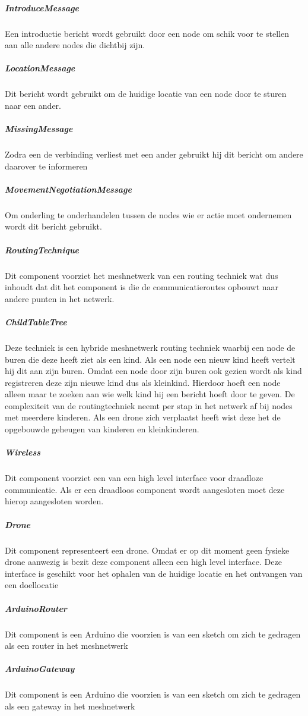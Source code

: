 \documentclass[a4paper, 11pt, oneside]{report}
\begin{document}
\subparagraph{IntroduceMessage}
\label{architectural:subcomponenten:IntroduceMessage}
Een introductie bericht wordt gebruikt door een node om schik voor te stellen aan alle andere nodes die dichtbij zijn. 
\subparagraph{LocationMessage}
\label{architectural:subcomponenten:LocationMessage}
Dit bericht wordt gebruikt om de huidige locatie van een node door te sturen naar een ander.
\subparagraph{MissingMessage}
\label{architectural:subcomponenten:MissingMessage}
Zodra een  de verbinding verliest met een ander gebruikt hij dit bericht om andere daarover te informeren
\subparagraph{MovementNegotiationMessage}	
\label{architectural:subcomponenten:MovementNegotiationMessage}
Om onderling te onderhandelen tussen de nodes wie er actie moet ondernemen wordt dit bericht gebruikt.
\subparagraph{RoutingTechnique}
\label{architectural:subcomponenten:RoutingTechnique}
Dit component voorziet het meshnetwerk van een routing techniek wat dus inhoudt dat dit het component is die de communicatieroutes opbouwt naar andere punten in het netwerk.
  
\subparagraph{ChildTableTree}
\label{architectural:subcomponenten:ChildTableTree}
Deze techniek is een hybride meshnetwerk routing techniek waarbij een node de buren die deze heeft ziet als een kind.
Als een node een nieuw kind heeft vertelt hij dit aan zijn buren.
Omdat een node door zijn buren ook gezien wordt als kind registreren deze zijn nieuwe kind dus als kleinkind.
Hierdoor hoeft een node alleen maar te zoeken aan wie welk kind hij een bericht hoeft door te geven. 
De complexiteit van de routingtechniek neemt per stap in het netwerk af bij nodes met meerdere kinderen.
Als een drone zich verplaatst heeft wist deze het de opgebouwde geheugen van kinderen en kleinkinderen. 

\subparagraph{Wireless}
\label{architectural:subcomponenten:Wireless}
Dit component voorziet een  van een high level interface voor draadloze communicatie.
Als er een draadloos component wordt aangesloten moet deze hierop aangesloten worden. 

\subparagraph{Drone}
\label{architectural:subcomponenten:Drone}
Dit component representeert een drone. Omdat er op dit moment geen fysieke drone aanwezig is bezit deze component alleen een high level interface.
Deze interface is geschikt voor het ophalen van de huidige locatie en het ontvangen van een doellocatie

\subparagraph{ArduinoRouter}
\label{architectural:subcomponenten:ArduinoRouter}
Dit component is een Arduino die voorzien is van een sketch om zich te gedragen als een router in het meshnetwerk
\subparagraph{ArduinoGateway}
\label{architectural:subcomponenten:ArduinoGateway}
Dit component is een Arduino die voorzien is van een sketch om zich te gedragen als een gateway in het meshnetwerk
\end{document}
